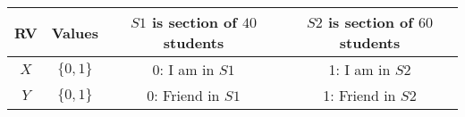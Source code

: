 
\begin{center}
\begin{tabular}{|c|c|c|c|}
\hline
\textbf{RV}& \textbf{Values} & \textbf{$S1$ is section of $40$ students} &\textbf{$S2$ is section of $60$ students} \\ \hline
$X$		   & 	$\{0,1\}$		&   0: I am in $S1$      & 1: I am in $S2$\\ \hline
$Y$ 		   & 	$\{0,1\}$	&	0: Friend in $S1$    & 1: Friend in $S2$\\ \hline
\end{tabular}
\end{center}